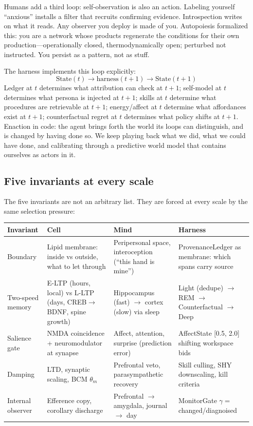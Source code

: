 \documentclass[11pt]{article}
\begin{document}
Humans add a third loop: self-observation is also an action. Labeling
yourself ``anxious'' installs a filter that recruits confirming
evidence. Introspection writes on what it reads. Any observer you deploy
is made of you. Autopoiesis \citep{maturana1980} formalized this: you
are a network whose products regenerate the conditions for their own
production---operationally closed, thermodynamically open; perturbed
not instructed. You persist as a pattern, not as stuff.

The harness implements this loop explicitly:
\begin{equation}
\mathrm{State}(t) \to \mathrm{harness}(t{+}1) \to \mathrm{State}(t{+}1)
\end{equation}
Ledger at $t$ determines what attribution can check at $t{+}1$;
self-model at $t$ determines what persona is injected at $t{+}1$;
skills at $t$ determine what procedures are retrievable at $t{+}1$;
energy/affect at $t$ determine what affordances exist at $t{+}1$;
counterfactual regret at $t$ determines what policy shifts at $t{+}1$.
Enaction in code: the agent brings forth the world its loops can
distinguish, and is changed by having done so. We keep playing back
what we did, what we could have done, and calibrating through a
predictive world model that contains ourselves as actors in it.

\subsection{Five invariants at every scale}

The five invariants are not an arbitrary list. They are forced at every
scale by the same selection pressure:

\begin{center}
\small
\begin{tabular}{P{2.2cm}P{2.6cm}P{2.8cm}P{3.2cm}}
\toprule
Invariant & Cell & Mind & Harness \\
\midrule
Boundary & Lipid membrane: inside vs outside, what to let through &
Peripersonal space, interoception (``this hand is mine'') &
ProvenanceLedger as membrane: which spans carry source \\
Two-speed memory & E-LTP (hours, local) vs L-LTP (days, CREB$\to$\allowbreak{}BDNF, spine growth) &
Hippocampus (fast) $\to$\allowbreak{} cortex (slow) via sleep &
Light (dedupe) $\to$\allowbreak{} REM $\to$\allowbreak{} Counterfactual $\to$\allowbreak{} Deep \\
Salience gate & NMDA coincidence + neuromodulator at synapse &
Affect, attention, surprise (prediction error) &
AffectState [0.5, 2.0] shifting workspace bids \\
Damping & LTD, synaptic scaling, BCM $\theta_m$ &
Prefrontal veto, parasympathetic recovery &
Skill culling, SHY downscaling, kill criteria \\
Internal observer & Efference copy, corollary discharge &
Prefrontal $\to$\allowbreak{} amygdala, journal $\to$\allowbreak{} day &
MonitorGate $\gamma=$ changed/diagnoised \\
\bottomrule
\end{tabular}
\end{center}
\end{document}
